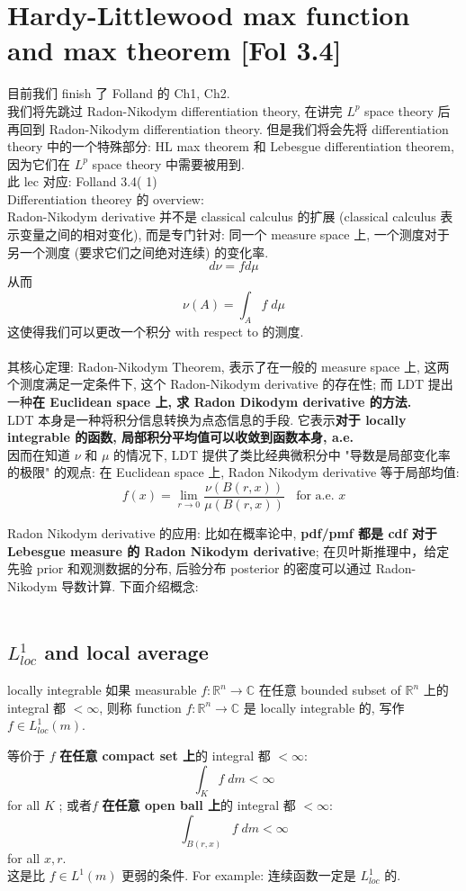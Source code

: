 \documentclass[lang=cn,11pt]{elegantbook}
\begin{document}
\chapter{Hardy-Littlewood max function and max theorem [Fol 3.4]}
目前我们 finish 了 Folland 的 Ch1, Ch2.\\
我们将先跳过 Radon-Nikodym differentiation theory, 在讲完 $L^p$ space theory 后再回到 Radon-Nikodym differentiation theory. 但是我们将会先将 differentiation theory 中的一个特殊部分: HL max theorem 和 Lebesgue differentiation theorem, 因为它们在 $L^p$ space theory 中需要被用到.\\
此 lec 对应: Folland 3.4( 1)\\

Differentiation theorey 的 overview: \\
Radon-Nikodym derivative 并不是 classical calculus 的扩展 (classical calculus 表示变量之间的相对变化), 而是专门针对: 同一个 measure space 上, 一个测度对于另一个测度 (要求它们之间绝对连续) 的变化率. \[
d\nu =  f  d\mu
\]
从而 \[
\nu(A)  = \int_A f \; d\mu
\]
这使得我们可以更改一个积分 with respect to 的测度. \\\\
其核心定理: Radon-Nikodym Theorem, 表示了在一般的 measure space 上, 这两个测度满足一定条件下, 这个 Radon-Nikodym derivative 的存在性; 而 LDT 提出一种\textbf{在 Euclidean space 上, 求 Radon Dikodym derivative 的方法.}\\
LDT 本身是一种将积分信息转换为点态信息的手段. 它表示\textbf{对于 locally integrable 的函数, 局部积分平均值可以收敛到函数本身, a.e.}\\ 
因而在知道 $\nu$ 和 $\mu$ 的情况下, LDT 提供了类比经典微积分中 "导数是局部变化率的极限" 的观点: 在 Euclidean space 上, Radon Nikodym derivative 等于局部均值: \[
f(x)  = \lim_{r \to 0 } \frac{\nu(B(r,x))}{\mu(B(r,x))} \;\; \text{ for a.e. } x
\]

Radon Nikodym derivative 的应用: 比如在概率论中, \textbf{pdf/pmf 都是 cdf 对于 Lebesgue measure 的 Radon Nikodym derivative}; 在贝叶斯推理中，给定先验 prior 和观测数据的分布, 后验分布 posterior 的密度可以通过 Radon-Nikodym 导数计算.
下面介绍概念:\\\\

\section{$L^1_{loc}$ and local average}
\begin{definition}{locally integrable}
如果 measurable  $f:\mathbb{R}^n \to \mathbb{C}$ 在任意 bounded subset of $\mathbb{R}^n$ 上的 integral 都 $< \infty$, 则称 function $f:\mathbb{R}^n \to \mathbb{C}$ 是 locally integrable 的, 写作 $f\in L^1_{loc}(m)$.
\end{definition}
\begin{remark}
    等价于 $f$ \textbf{在任意 compact set 上}的 integral 都 $< \infty$: \[
    \int_K f\; dm < \infty
    \]for all $K$ ; 或者$f$ \textbf{在任意 open ball 上}的 integral 都 $< \infty$: \[
    \int_{B(r,x)} f \; dm< \infty
    \] for all $x,r$.\\
    这是比 $f \in L^1(m)$ 更弱的条件. For example: 连续函数一定是 $L^1_{loc}$ 的.
\end{remark}
\end{document}
